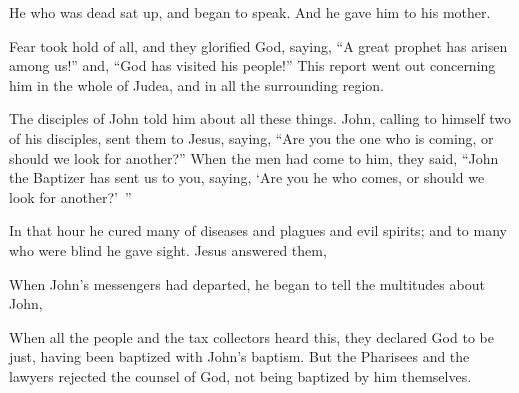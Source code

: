 {{}
He who was dead sat up, and began to speak. And he gave him to his mother.
\par }{\PP {}Fear took hold of all, and they glorified God, saying, “A great prophet has arisen among us!” and, “God has visited his people!”
This report went out concerning him in the whole of Judea, and in all the surrounding region.
\par }{\PP {}The disciples of John told him about all these things.
John, calling to himself two of his disciples, sent them to Jesus, saying, “Are you the one who is coming, or should we look for another?”
When the men had come to him, they said, “John the Baptizer has sent us to you, saying, ‘Are you he who comes, or should we look for another?’ ”
\par }{\PP {}In that hour he cured many of diseases and plagues and evil spirits; and to many who were blind he gave sight.
Jesus answered them,
{}
\par }{\PP {}When John’s messengers had departed, he began to tell the multitudes about John,
{}
\par }{
\par }{
\par }{\PP {}
\par }{\PP {}When all the people and the tax collectors heard this, they declared God to be just, having been baptized with John’s baptism.
But the Pharisees and the lawyers rejected the counsel of God, not being baptized by him themselves.
}
